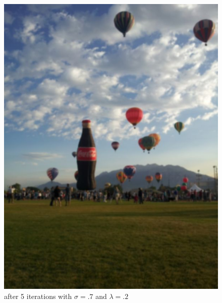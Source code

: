 \begin{figure}[ht]
\begin{minipage}[b]{0.45\linewidth}
\includegraphics[width=\textwidth]{baloon_resized_color_5.jpg}
\caption*{after 5 iterations with $\sigma = .7$ and $\lambda = .2$}
\end{minipage}
\begin{minipage}[b]{0.45\linewidth}
\centering

\end{minipage}
\end{figure}
